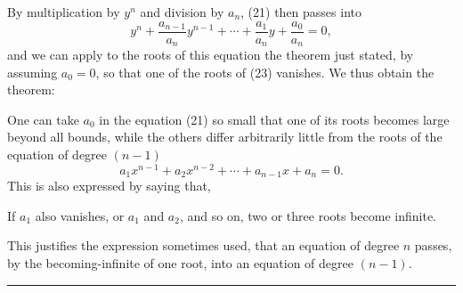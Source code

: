 
By multiplication by $y^n$ and division by $a_n$, (21) then passes into
\begin{equation}
 y^n+\frac{a_{n-1}}{a_n}y^{n-1}+\cdots+\frac{a_1}{a_n}y+\frac{a_0}{a_n}=0,
\tag{23}
\end{equation}
and we can apply to the roots of this equation the theorem just stated, by assuming $a_0=0$, so that one of the roots of (23) vanishes. We thus obtain the theorem:

One can take $a_0$ in the equation (21) so small that one of its roots becomes large beyond all bounds, while the others differ arbitrarily little from the roots of the equation of degree $(n-1)$
\[
 a_1x^{n-1}+a_2x^{n-2}+\cdots+a_{n-1}x+a_n=0.
\]
This is also expressed by saying that, 

If $a_1$ also vanishes, or $a_1$ and $a_2$, and so on, two or three roots become infinite.

This justifies the expression sometimes used, that an equation of degree $n$ passes, by the becoming-infinite of one root, into an equation of degree $(n-1)$.

\begin{center}
\rule{0.16\textwidth}{0.4pt}
\end{center}
